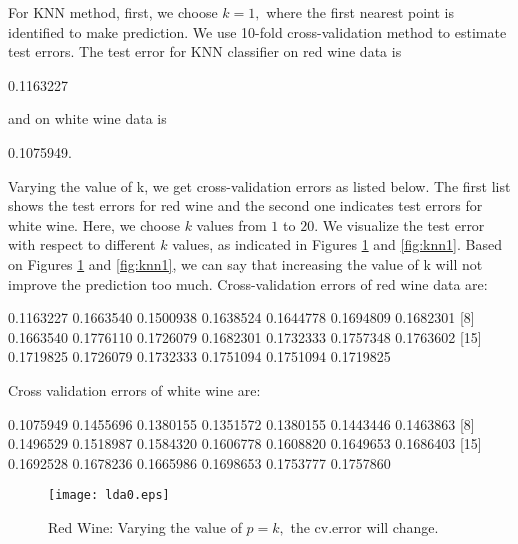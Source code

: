 \documentclass[12pt]{article}
\begin{document}
For KNN method, first, we choose $k=1,$ where the first nearest point is identified to make prediction. We use 10-fold cross-validation method to estimate test errors. The test error for KNN classifier on red wine data is
\begin{Schunk}
\begin{Soutput}
[1] 0.1163227
\end{Soutput}
\end{Schunk}
and on white wine data is
 \begin{Schunk}
\begin{Soutput}
[1] 0.1075949.
\end{Soutput}
\end{Schunk}
 Varying the value of k, we get cross-validation errors as listed below. The first list shows the test errors for red wine and the second one indicates test errors for white wine. Here, we choose $k$ values from $1$ to $20.$ We visualize the test error with respect to different $k$ values, as indicated in Figures \ref{fig:knn0} and \ref{fig:knn1}. Based on Figures \ref{fig:knn0} and \ref{fig:knn1}, we can say that increasing the value of k will not improve the prediction too much.
Cross-validation errors of red wine data are:
\begin{Schunk}
\begin{Soutput}
 [1] 0.1163227 0.1663540 0.1500938 0.1638524 0.1644778 0.1694809 0.1682301
 [8] 0.1663540 0.1776110 0.1726079 0.1682301 0.1732333 0.1757348 0.1763602
[15] 0.1719825 0.1726079 0.1732333 0.1751094 0.1751094 0.1719825
\end{Soutput}
\end{Schunk}
Cross validation errors of white wine are:
\begin{Schunk}
\begin{Soutput}
 [1] 0.1075949 0.1455696 0.1380155 0.1351572 0.1380155 0.1443446 0.1463863
 [8] 0.1496529 0.1518987 0.1584320 0.1606778 0.1608820 0.1649653 0.1686403
[15] 0.1692528 0.1678236 0.1665986 0.1698653 0.1753777 0.1757860
\end{Soutput}
\end{Schunk}

\begin{figure} [htbp]
 \begin{center}
\texttt{[image: lda0.eps]}
\caption{Red Wine: Varying the value of $p=k,$ the cv.error will change.}
 \label{fig:knn0}
\end{center}
\end{figure}
\end{document}
